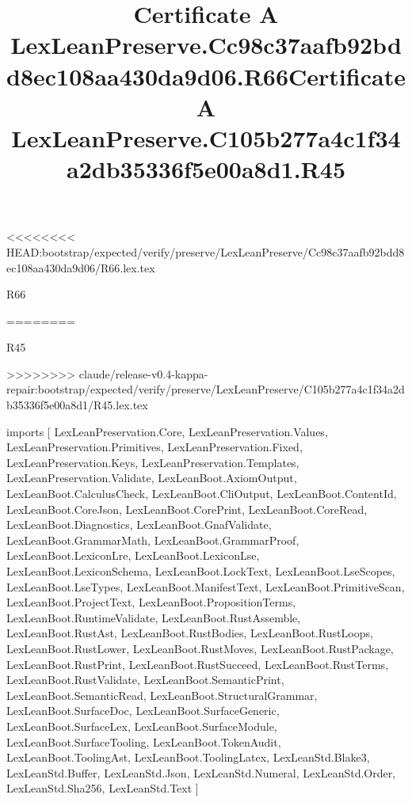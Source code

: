 <<<<<<<< HEAD:bootstrap/expected/verify/preserve/LexLeanPreserve/Cc98c37aafb92bdd8ec108aa430da9d06/R66.lex.tex
\begin{lexlean}{R66}
\title{Certificate A LexLeanPreserve.Cc98c37aafb92bdd8ec108aa430da9d06.R66}
========
\begin{lexlean}{R45}
\title{Certificate A LexLeanPreserve.C105b277a4c1f34a2db35336f5e00a8d1.R45}
>>>>>>>> claude/release-v0.4-kappa-repair:bootstrap/expected/verify/preserve/LexLeanPreserve/C105b277a4c1f34a2db35336f5e00a8d1/R45.lex.tex
\begin{coremodule}
imports [
  LexLeanPreservation.Core,
  LexLeanPreservation.Values,
  LexLeanPreservation.Primitives,
  LexLeanPreservation.Fixed,
  LexLeanPreservation.Keys,
  LexLeanPreservation.Templates,
  LexLeanPreservation.Validate,
  LexLeanBoot.AxiomOutput,
  LexLeanBoot.CalculusCheck,
  LexLeanBoot.CliOutput,
  LexLeanBoot.ContentId,
  LexLeanBoot.CoreJson,
  LexLeanBoot.CorePrint,
  LexLeanBoot.CoreRead,
  LexLeanBoot.Diagnostics,
  LexLeanBoot.GnafValidate,
  LexLeanBoot.GrammarMath,
  LexLeanBoot.GrammarProof,
  LexLeanBoot.LexiconLre,
  LexLeanBoot.LexiconLse,
  LexLeanBoot.LexiconSchema,
  LexLeanBoot.LockText,
  LexLeanBoot.LseScopes,
  LexLeanBoot.LseTypes,
  LexLeanBoot.ManifestText,
  LexLeanBoot.PrimitiveScan,
  LexLeanBoot.ProjectText,
  LexLeanBoot.PropositionTerms,
  LexLeanBoot.RuntimeValidate,
  LexLeanBoot.RustAssemble,
  LexLeanBoot.RustAst,
  LexLeanBoot.RustBodies,
  LexLeanBoot.RustLoops,
  LexLeanBoot.RustLower,
  LexLeanBoot.RustMoves,
  LexLeanBoot.RustPackage,
  LexLeanBoot.RustPrint,
  LexLeanBoot.RustSucceed,
  LexLeanBoot.RustTerms,
  LexLeanBoot.RustValidate,
  LexLeanBoot.SemanticPrint,
  LexLeanBoot.SemanticRead,
  LexLeanBoot.StructuralGrammar,
  LexLeanBoot.SurfaceDoc,
  LexLeanBoot.SurfaceGeneric,
  LexLeanBoot.SurfaceLex,
  LexLeanBoot.SurfaceModule,
  LexLeanBoot.SurfaceTooling,
  LexLeanBoot.TokenAudit,
  LexLeanBoot.ToolingAst,
  LexLeanBoot.ToolingLatex,
  LexLeanStd.Blake3,
  LexLeanStd.Buffer,
  LexLeanStd.Json,
  LexLeanStd.Numeral,
  LexLeanStd.Order,
  LexLeanStd.Sha256,
  LexLeanStd.Text
]


\end{coremodule}
\end{lexlean}
\end{lexlean}
